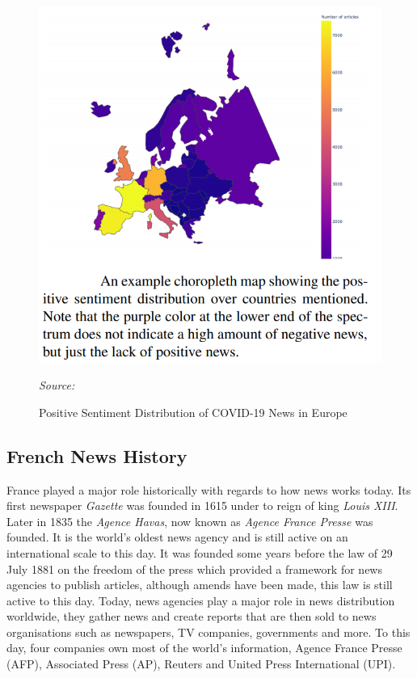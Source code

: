 \begin{figure}[H]
      \centering
      \includegraphics[scale=0.65]{lit_review/eu_2.png}
      \caption{Positive Sentiment Distribution of COVID-19 News in Europe}
      \label{fig:eu mood}
      \emph{Source: \cite{robertson2021covid}}
\end{figure}

\subsection{French News History}\label{chap:French Press}

France played a major role historically with regards to how news works today. Its first newspaper \emph{Gazette} was founded in 1615 under to reign of king \emph{Louis XIII}. Later in 1835 the \emph{Agence Havas}, now known as \emph{Agence France Presse} was founded. It is the world's oldest news agency and is still active on an international scale to this day. It was founded some years before the law of 29 July 1881 on the freedom of the press which provided a framework for news agencies to publish articles, although amends have been made, this law is still active to this day. Today, news agencies play a major role in news distribution worldwide, they gather news and create reports that are then sold to news organisations such as newspapers, TV companies, governments and more. To this day, four companies own most of the world's information, Agence France Presse (AFP), Associated Press (AP), Reuters and United Press International (UPI).

